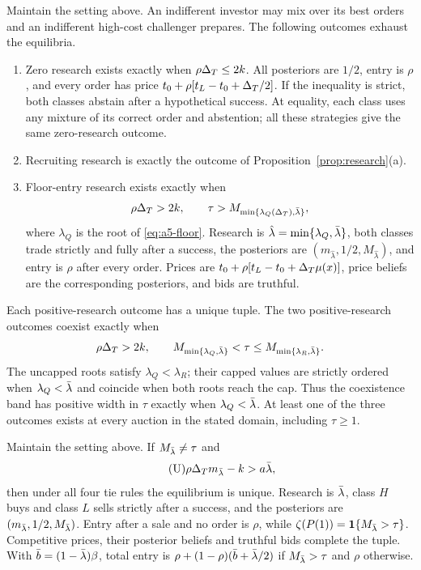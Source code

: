 \begin{lemma}\label{lem:a5-outcomes}
Maintain the setting above. An indifferent investor may mix over its best orders and an indifferent high-cost
challenger prepares. The following outcomes exhaust the equilibria.
\begin{enumerate}[label=(\alph*),leftmargin=2em]
\item Zero research exists exactly when \(\rho\Delta_T\le2k\). All posteriors are \(1/2\), entry is \(\rho\), and
every order has price \(t_0+\rho[t_L-t_0+\Delta_T/2]\). If the inequality is strict, both classes abstain after a
hypothetical success. At equality, each class uses any mixture of its correct order and abstention; all these
strategies give the same zero-research outcome.
\item Recruiting research is exactly the outcome of Proposition~\ref{prop:research}(a).
\item Floor-entry research exists exactly when
\[
 \rho\Delta_T>2k,\qquad \tau>M_{\min\{\lambda_Q(\Delta_T),\bar\lambda\}},
\]
where \(\lambda_Q\) is the root of \eqref{eq:a5-floor}.
Research is \(\hat\lambda=\min\{\lambda_Q,\bar\lambda\}\), both classes trade strictly and fully after a success, the
posteriors are \((m_{\hat\lambda},1/2,M_{\hat\lambda})\), and entry is \(\rho\) after every order. Prices are
\(t_0+\rho[t_L-t_0+\Delta_T\mu(x)]\), price beliefs are the corresponding posteriors, and bids are truthful.
\end{enumerate}
Each positive-research outcome has a unique tuple. The two positive-research outcomes coexist exactly when
\[
 \rho\Delta_T>2k,\qquad
 M_{\min\{\lambda_Q,\bar\lambda\}}<\tau\le M_{\min\{\lambda_R,\bar\lambda\}}.
\]
The uncapped roots satisfy \(\lambda_Q<\lambda_R\); their capped values are strictly ordered when
\(\lambda_Q<\bar\lambda\) and coincide when both roots reach the cap. Thus the coexistence band has positive width in
\(\tau\) exactly when \(\lambda_Q<\bar\lambda\). At least one of the three outcomes exists at every auction in the
stated domain, including \(\tau\ge1\).
\end{lemma}

\begin{lemma}\label{lem:a5-strong}
Maintain the setting above. If \(M_{\bar\lambda}\ne\tau\) and
\begin{equation}\tag{U}\label{eq:a5-U}
 \rho\Delta_T m_{\bar\lambda}-k>a\bar\lambda,
\end{equation}
then under all four tie rules the equilibrium is unique. Research is \(\bar\lambda\), class \(H\) buys and class \(L\)
sells strictly after a success, and the posteriors are \((m_{\bar\lambda},1/2,M_{\bar\lambda})\). Entry after a sale and no order
is \(\rho\), while \(\zeta(P(1))=\mathbf{1}\{M_{\bar\lambda}>\tau\}\). Competitive prices, their posterior beliefs and
truthful bids complete the tuple. With \(\bar b=(1-\bar\lambda)\beta\), total entry is
\(\rho+(1-\rho)(\bar b+\bar\lambda/2)\) if \(M_{\bar\lambda}>\tau\) and \(\rho\) otherwise.
\end{lemma}

